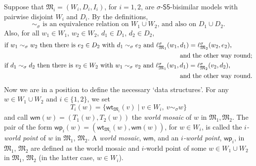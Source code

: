 \documentclass[10pt,a4paper]{amsart}
\theoremstyle{plain}
\theoremstyle{definition}
\newcommand{\FOMS}{\ensuremath{\mathsf{Q^1S5}}}
\newcommand{\wt}{\mathsf{wt}}
\newcommand{\wm}{\mathsf{wm}}
\newcommand{\iwp}{\mathsf{wp}_i}
\begin{document}
Suppose that $\mathfrak{M}_{i}= (W_i,D_i,I_i)$, for $i = 1,2$, are $\sigma$-$\mathsf{S5}$-bisimilar
models with pairwise disjoint $W_i$ and $D_i$.
By the definitions,
%
\begin{equation}\label{simequiv}
\mbox{$\sim_\sigma$ is an equivalence relation on $W_1\cup W_2$, and also on $D_1\cup D_2$.}
\end{equation}
%
Also, for all $w_1\in W_1$, $w_2\in W_2$, $d_1\in D_1$, $d_2\in D_2$,
%
\begin{align}
\nonumber
& \mbox{if $w_1\sim_\sigma w_2$ then there is $e_2\in D_2$ with
$d_1\sim_\sigma e_2$ and $\ell^\sigma_{\mathfrak M_1}(w_1,d_1) =\ell^\sigma_{\mathfrak M_2}(w_2,e_2)$,}\\
\label{simW}
& \hspace*{9.5cm}\mbox{and the other way round;}\\
\nonumber
& \mbox{if $d_1\sim_\sigma d_2$ then there is $v_2\in W_2$ with
$w_1\sim_\sigma v_2$ and $\ell^\sigma_{\mathfrak M_1}(w_1,d_1) =\ell^\sigma_{\mathfrak M_2}(
v_2,d_2)$,}\\
\label{simD}
& \hspace*{9.5cm}\mbox{and the other way round.}
\end{align}
%
Now we are in a position to define the necessary `data structures'. 
%
For any $w\in W_{1}\cup W_{2}$ and $i \in \{1,2\}$, we set
%
\begin{equation}\label{world-m}
T_{i}(w) = \{ \wt_{\mathfrak{M}_{i}}(v) \mid v \in W_{i}, \ v \sim_{\sigma} w\}
\end{equation}
%
and call $\wm(w) = (T_{1}(w),T_{2}(w))$ the \emph{world mosaic} of $w$ in $\mathfrak{M}_{1},\mathfrak{M}_{2}$. The pair of the form $\iwp(w) = (\wt_{\mathfrak{M}_{i}}(w),\wm(w))$, for $w\in W_{i}$, is called the \emph{$i$-world point} of $w$ in $\mathfrak{M}_{1}$, $\mathfrak{M}_{2}$. 
%
A \emph{world mosaic}, $\wm$, and an \emph{$i$-world point}, $\iwp$, in $\mathfrak{M}_{1}$, $\mathfrak{M}_{2}$ are defined as the world mosaic and $i$-world point of some $w\in W_{1} \cup W_2$ in $\mathfrak{M}_{1}$, $\mathfrak{M}_{2}$ (in the latter case, $w \in W_i$). 
\end{document}
